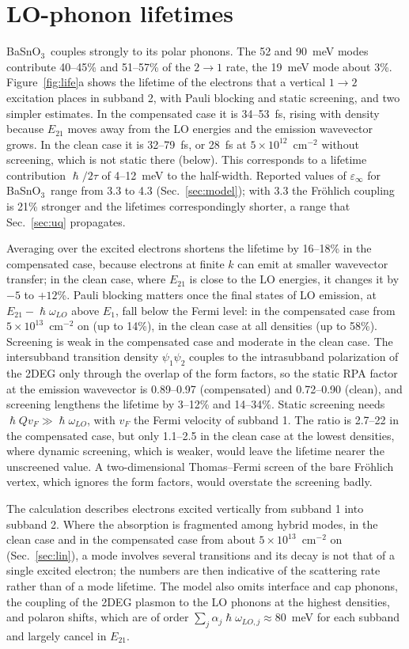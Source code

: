 \documentclass[11pt]{article}
\newcommand{\BSO}{\texorpdfstring{BaSnO$_3$}{BaSnO3}}
\begin{document}
\section{LO-phonon lifetimes}\label{sec:tau}
\BSO\ couples strongly to its polar phonons. The 52 and 90~meV modes contribute 40--45\% and 51--57\% of the $2\to1$ rate, the 19~meV mode about 3\%. Figure~\ref{fig:life}a shows the lifetime of the electrons that a vertical $1\to2$ excitation places in subband 2, with Pauli blocking and static screening, and two simpler estimates. In the compensated case it is 34--53~fs, rising with density because $E_{21}$ moves away from the LO energies and the emission wavevector grows. In the clean case it is 32--79~fs, or 28~fs at $5\times10^{12}$~cm$^{-2}$ without screening, which is not static there (below). This corresponds to a lifetime contribution $\hslash/2\tau$ of 4--12~meV to the half-width. Reported values of $\varepsilon_\infty$ for \BSO\ range from 3.3 to 4.3 (Sec.~\ref{sec:model}); with 3.3 the Fr\"ohlich coupling is 21\% stronger and the lifetimes correspondingly shorter, a range that Sec.~\ref{sec:uq} propagates.

Averaging over the excited electrons shortens the lifetime by 16--18\% in the compensated case, because electrons at finite $k$ can emit at smaller wavevector transfer; in the clean case, where $E_{21}$ is close to the LO energies, it changes it by $-5$ to $+12$\%. Pauli blocking matters once the final states of LO emission, at $E_{21}-\hslash\omega_{LO}$ above $E_1$, fall below the Fermi level: in the compensated case from $5\times10^{13}$~cm$^{-2}$ on (up to 14\%), in the clean case at all densities (up to 58\%). Screening is weak in the compensated case and moderate in the clean case. The intersubband transition density $\psi_1\psi_2$ couples to the intrasubband polarization of the 2DEG only through the overlap of the form factors, so the static RPA factor at the emission wavevector is 0.89--0.97 (compensated) and 0.72--0.90 (clean), and screening lengthens the lifetime by 3--12\% and 14--34\%. Static screening needs $\hslash Qv_F\gg\hslash\omega_{LO}$, with $v_F$ the Fermi velocity of subband 1. The ratio is 2.7--22 in the compensated case, but only 1.1--2.5 in the clean case at the lowest densities, where dynamic screening, which is weaker, would leave the lifetime nearer the unscreened value. A two-dimensional Thomas--Fermi screen of the bare Fr\"ohlich vertex, which ignores the form factors, would overstate the screening badly.

The calculation describes electrons excited vertically from subband 1 into subband 2. Where the absorption is fragmented among hybrid modes, in the clean case and in the compensated case from about $5\times10^{13}$~cm$^{-2}$ on (Sec.~\ref{sec:lin}), a mode involves several transitions and its decay is not that of a single excited electron; the numbers are then indicative of the scattering rate rather than of a mode lifetime. The model also omits interface and cap phonons, the coupling of the 2DEG plasmon to the LO phonons at the highest densities, and polaron shifts, which are of order $\sum_j\alpha_j\hslash\omega_{LO,j}\approx80$~meV for each subband and largely cancel in $E_{21}$.
\end{document}
